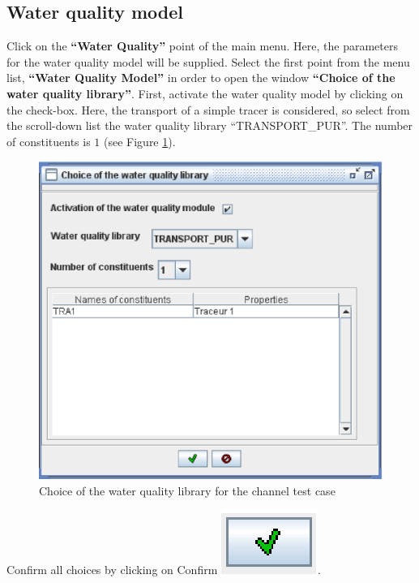 \documentclass[a4paper,12pt]{article}
\begin{document}
\subsection{Water quality model }

\hspace{0.5cm}Click on the \textbf{{}``Water Quality''} point of the main menu.
Here, the parameters for the water quality model will be supplied.
Select the first point from the menu list, \textbf{{}``Water Quality
Model''} in order to open the window \textbf{{}``Choice of the water
quality library''}. First, activate the water quality model by clicking
on the check-box. Here, the transport of a simple tracer is considered,
so select from the scroll-down list the water quality library {}``TRANSPORT\_PUR''.
The number of constituents is $1$ (see Figure \ref{fig:WQ_lib}). 

\begin{figure}[h]
  \begin{center}
  \includegraphics[scale=0.6]{wq_model}
  \caption{Choice of the water quality library for the channel test case}
  \label{fig:WQ_lib}
  \end{center}
\end{figure}


Confirm all choices by clicking on Confirm \includegraphics[scale=0.6]{valid}.
\end{document}
